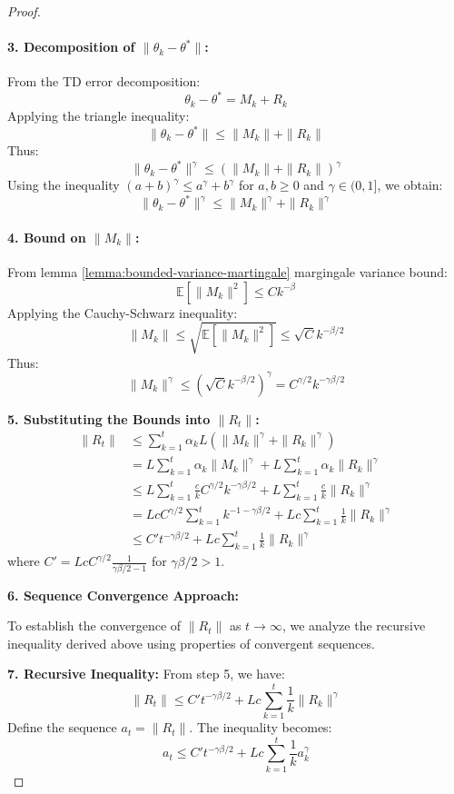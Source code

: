 \begin{proof}
\paragraph{3. Decomposition of \( \|\theta_k - \theta^*\| \):}
From the TD error decomposition:
\[
\theta_k - \theta^* = M_k + R_k
\]
Applying the triangle inequality:
\[
\|\theta_k - \theta^*\| \leq \|M_k\| + \|R_k\|
\]
Thus:
\[
\|\theta_k - \theta^*\|^\gamma \leq (\|M_k\| + \|R_k\|)^\gamma
\]
Using the inequality \( (a + b)^\gamma \leq a^\gamma + b^\gamma \) for \( a, b \geq 0 \) and \( \gamma \in (0, 1] \), we obtain:
\[
\|\theta_k - \theta^*\|^\gamma \leq \|M_k\|^\gamma + \|R_k\|^\gamma
\]

\paragraph{4. Bound on \( \|M_k\| \):}
From lemma \ref{lemma:bounded-variance-martingale} margingale variance bound:
\[
\mathbb{E}[\|M_k\|^2] \leq C k^{-\beta}
\]
Applying the Cauchy-Schwarz inequality:
\[
\|M_k\| \leq \sqrt{\mathbb{E}[\|M_k\|^2]} \leq \sqrt{C} k^{-\beta/2}
\]
Thus:
\[
\|M_k\|^\gamma \leq (\sqrt{C} k^{-\beta/2})^\gamma = C^{\gamma/2} k^{-\gamma\beta/2}
\]

\textbf{5. Substituting the Bounds into \( \|R_t\| \):}
\begin{align*}
\|R_t\| &\leq \sum_{k=1}^t \alpha_k L (\|M_k\|^\gamma + \|R_k\|^\gamma) \\
&= L \sum_{k=1}^t \alpha_k \|M_k\|^\gamma + L \sum_{k=1}^t \alpha_k \|R_k\|^\gamma \\
&\leq L \sum_{k=1}^t \frac{c}{k} C^{\gamma/2} k^{-\gamma\beta/2} + L \sum_{k=1}^t \frac{c}{k} \|R_k\|^\gamma \\
&= L c C^{\gamma/2} \sum_{k=1}^t k^{-1 - \gamma\beta/2} + L c \sum_{k=1}^t \frac{1}{k} \|R_k\|^\gamma \\
&\leq C' t^{-\gamma\beta/2} + L c \sum_{k=1}^t \frac{1}{k} \|R_k\|^\gamma
\end{align*}
where \( C' = L c C^{\gamma/2} \frac{1}{\gamma\beta/2 - 1} \) for \( \gamma\beta/2 > 1 \).

\textbf{6. Sequence Convergence Approach:}

To establish the convergence of \( \|R_t\| \) as \( t \to \infty \), we analyze the recursive inequality derived above using properties of convergent sequences.

\textbf{7. Recursive Inequality:}
From step 5, we have:
\[
\|R_t\| \leq C' t^{-\gamma\beta/2} + L c \sum_{k=1}^t \frac{1}{k} \|R_k\|^\gamma
\]
Define the sequence \( a_t = \|R_t\| \). The inequality becomes:
\[
a_t \leq C' t^{-\gamma\beta/2} + L c \sum_{k=1}^t \frac{1}{k} a_k^\gamma
\]


\end{proof}
